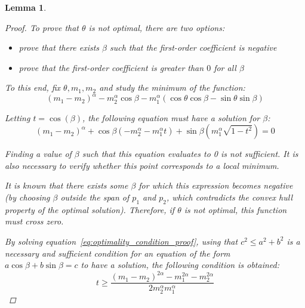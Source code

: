 \documentclass[12pt,a4paper]{article}
\numberwithin{equation}{section}
\theoremstyle{mytheorem}
\newtheorem{lemma}[subsection]{Lemma}
\theoremstyle{myremark}
\theoremstyle{myparagraph}
\begin{document}
\begin{lemma}
\begin{proof}
            To prove that $\theta$ is not optimal, there are two options:
            \begin{itemize}
                \item prove that there exists $\beta$ such that the first-order coefficient is negative
                \item prove that the first-order coefficient is greater than $0$ for all $\beta$
            \end{itemize}

            To this end, fix $\theta, m_1, m_2$ and study the minimum of the function:
            \begin{equation}
                (m_1-m_2)
                ^\alpha - m_2^\alpha \cos\beta - m_1^\alpha (\cos\theta\cos\beta - \sin\theta\sin\beta)
            \end{equation}

            Letting $t = \cos(\beta)$, the following equation must have a solution for $\beta$:
            \begin{equation}
                \label{eq:optimality_condition_proof}
                (m_1-m_2)
                ^{\alpha} + \cos\beta(-m_2^\alpha-m_1^\alpha t) + \sin\beta(m_1^\alpha \sqrt{1-t^2}) = 0
            \end{equation}

            Finding a value of $\beta$ such that this equation evaluates to 0 is not sufficient.
            It is also necessary to verify whether this point corresponds to a local minimum.

            It is known that there exists some $\beta$ for which this expression becomes negative (by choosing $\beta$ outside the
            span of $p_1$ and $p_2$, which contradicts the convex hull property of the optimal solution). Therefore, if $\theta$
            is not optimal, this function must cross zero.

            By solving equation~\ref{eq:optimality_condition_proof}, using that $c^2 \le a^2 + b^2$ is a necessary and
            sufficient condition for an equation of the form $a\cos\beta + b\sin\beta = c$ to have a solution, the following condition is obtained:
            \begin{equation}
                \label{eq:optimality_condition_proof_2}
                t \ge \frac{(m_1-m_2)^{2\alpha} - m_1^{2\alpha} - m_2^{2\alpha}}{2m_2^\alpha m_1^\alpha}
            \end{equation}
        \end{proof}
    \end{lemma}
    
\end{document}

